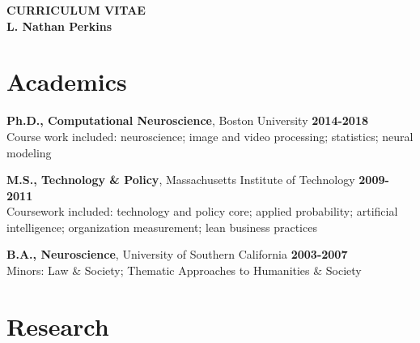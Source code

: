 
\thispagestyle{empty}

\begin{center}
{\LARGE {\bf CURRICULUM VITAE}}\\
\vspace{0.25in}
{\large {\bf L. Nathan Perkins}}
\end{center}

\newenvironment{list1}{
  \begin{list}{\ding{113}}{%
      \setlength{\itemsep}{0in}
      \setlength{\parsep}{0in} \setlength{\parskip}{0in}
      \setlength{\topsep}{0in} \setlength{\partopsep}{0in} 
      \setlength{\leftmargin}{0in}}}{\end{list}}

\newenvironment{list2}{
  \begin{list}{$\bullet$}{%
      \setlength{\itemsep}{0in}
      \setlength{\parsep}{0in} \setlength{\parskip}{0in}
      \setlength{\topsep}{0in} \setlength{\partopsep}{0in} 
      \setlength{\leftmargin}{0.25in}}}{\end{list}}


\section*{Academics}

\textbf{Ph.D., Computational Neuroscience}, Boston University \hfill \textbf{2014-2018} \\
	Course work included: neuroscience; image and video processing; statistics; neural modeling

\bigskip

\noindent
\textbf{M.S., Technology \& Policy}, Massachusetts Institute of Technology \hfill \textbf{2009-2011} \\
	Coursework included: technology and policy core; applied probability; artificial intelligence; organization measurement; lean business practices

\bigskip

\noindent
\textbf{B.A., Neuroscience}, University of Southern California \hfill \textbf{2003-2007} \\
	Minors: Law \& Society; Thematic Approaches to Humanities \& Society
	
\section*{Research}

